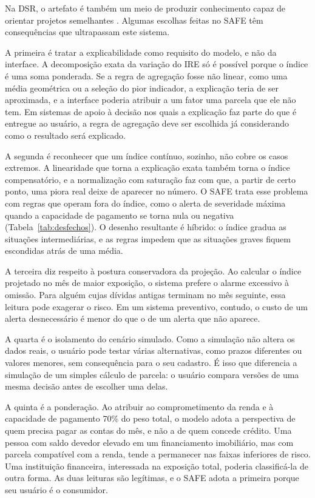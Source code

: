 \documentclass[portuguese]{sbc2025}%
\begin{document}
Na DSR, o artefato é também um meio de produzir conhecimento capaz de orientar projetos semelhantes \citep{hevner2004}. Algumas escolhas feitas no SAFE têm consequências que ultrapassam este sistema.

A primeira é tratar a explicabilidade como requisito do modelo, e não da interface. A decomposição exata da variação do IRE só é possível porque o índice é uma soma ponderada. Se a regra de agregação fosse não linear, como uma média geométrica ou a seleção do pior indicador, a explicação teria de ser aproximada, e a interface poderia atribuir a um fator uma parcela que ele não tem. Em sistemas de apoio à decisão nos quais a explicação faz parte do que é entregue ao usuário, a regra de agregação deve ser escolhida já considerando como o resultado será explicado.

A segunda é reconhecer que um índice contínuo, sozinho, não cobre os casos extremos. A linearidade que torna a explicação exata também torna o índice compensatório, e a normalização com saturação faz com que, a partir de certo ponto, uma piora real deixe de aparecer no número. O SAFE trata esse problema com regras que operam fora do índice, como o alerta de severidade máxima quando a capacidade de pagamento se torna nula ou negativa (Tabela~\ref{tab:desfechos}). O desenho resultante é híbrido: o índice gradua as situações intermediárias, e as regras impedem que as situações graves fiquem escondidas atrás de uma média.

A terceira diz respeito à postura conservadora da projeção. Ao calcular o índice projetado no mês de maior exposição, o sistema prefere o alarme excessivo à omissão. Para alguém cujas dívidas antigas terminam no mês seguinte, essa leitura pode exagerar o risco. Em um sistema preventivo, contudo, o custo de um alerta desnecessário é menor do que o de um alerta que não aparece.

A quarta é o isolamento do cenário simulado. Como a simulação não altera os dados reais, o usuário pode testar várias alternativas, como prazos diferentes ou valores menores, sem consequência para o seu cadastro. É isso que diferencia a simulação de um simples cálculo de parcela: o usuário compara versões de uma mesma decisão antes de escolher uma delas.

A quinta é a ponderação. Ao atribuir ao comprometimento da renda e à capacidade de pagamento 70\% do peso total, o modelo adota a perspectiva de quem precisa pagar as contas do mês, e não a de quem concede crédito. Uma pessoa com saldo devedor elevado em um financiamento imobiliário, mas com parcela compatível com a renda, tende a permanecer nas faixas inferiores de risco. Uma instituição financeira, interessada na exposição total, poderia classificá-la de outra forma. As duas leituras são legítimas, e o SAFE adota a primeira porque seu usuário é o consumidor.
\end{document}
